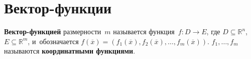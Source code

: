 \section{Вектор-функции}
 \textbf{Вектор-функцией} размерности~$m$ называется функция~$f \colon D \to E$, где $D \subseteq \mathbb R^n$, $E \subseteq \mathbb R^m$, и~обозначается $f(\overline x) = (f_1(\overline x), f_2(\overline x), \ldots, f_m(\overline x))$.
$f_1, \ldots, f_m$ называются \textbf{координатными функциями}.